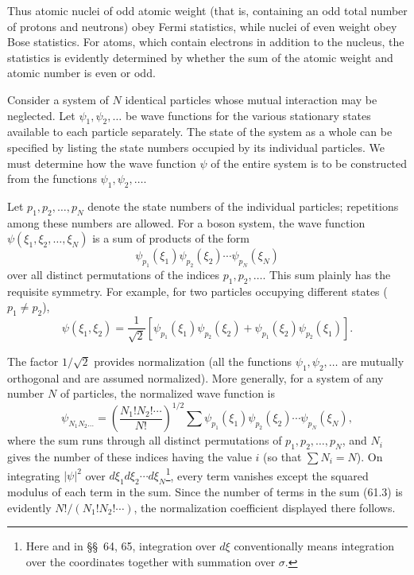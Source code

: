 Thus atomic nuclei of odd atomic weight (that is, containing an odd total number of protons and neutrons) obey Fermi statistics, while nuclei of even weight obey Bose statistics. For atoms, which contain electrons in addition to the nucleus, the statistics is evidently determined by whether the sum of the atomic weight and atomic number is even or odd.

Consider a system of $N$ identical particles whose mutual interaction may be neglected. Let $\psi_1,\psi_2,\ldots$ be wave functions for the various stationary states available to each particle separately. The state of the system as a whole can be specified by listing the state numbers occupied by its individual particles. We must determine how the wave function $\psi$ of the entire system is to be constructed from the functions $\psi_1,\psi_2,\ldots$.

Let $p_1,p_2,\ldots,p_N$ denote the state numbers of the individual particles; repetitions among these numbers are allowed. For a boson system, the wave function $\psi(\xi_1,\xi_2,\ldots,\xi_N)$ is a sum of products of the form
\begin{equation}
  \psi_{p_1}(\xi_1)\psi_{p_2}(\xi_2)\cdots\psi_{p_N}(\xi_N)
  \tag{61.1}
\end{equation}
over all distinct permutations of the indices $p_1,p_2,\ldots$. This sum plainly has the requisite symmetry. For example, for two particles occupying different states ($p_1\ne p_2$),
\begin{equation}
 \psi(\xi_1,\xi_2)=\frac1{\sqrt2}\left[\psi_{p_1}(\xi_1)\psi_{p_2}(\xi_2)+\psi_{p_1}(\xi_2)\psi_{p_2}(\xi_1)\right].
 \tag{61.2}
\end{equation}

The factor $1/\sqrt2$ provides normalization (all the functions $\psi_1,\psi_2,\ldots$ are mutually orthogonal and are assumed normalized). More generally, for a system of any number $N$ of particles, the normalized wave function is
\begin{equation}
 \psi_{N_1N_2\ldots}=\left(\frac{N_1!N_2!\cdots}{N!}\right)^{1/2}
 \sum \psi_{p_1}(\xi_1)\psi_{p_2}(\xi_2)\cdots\psi_{p_N}(\xi_N),
 \tag{61.3}
\end{equation}
where the sum runs through all distinct permutations of $p_1,p_2,\ldots,p_N$, and $N_i$ gives the number of these indices having the value $i$ (so that $\sum N_i=N$). On integrating $|\psi|^2$ over $d\xi_1d\xi_2\cdots d\xi_N$\footnote{Here and in §§~64, 65, integration over $d\xi$ conventionally means integration over the coordinates together with summation over $\sigma$.}, every term vanishes except the squared modulus of each term in the sum. Since the number of terms in the sum (61.3) is evidently $N!/(N_1!N_2!\cdots)$, the normalization coefficient displayed there follows.

